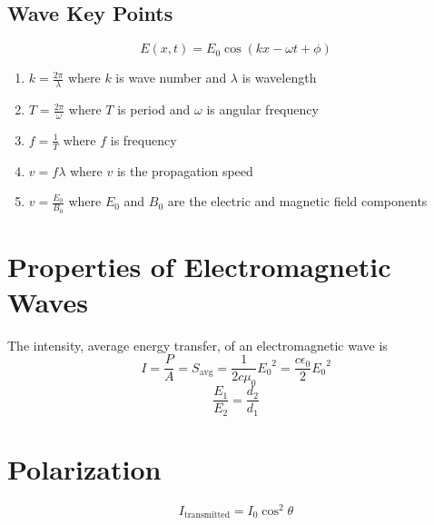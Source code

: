 \documentclass{article}
\begin{document}
\subsection*{Wave Key Points}
\[E(x, t) = E_0 \cos\left(kx - \omega t + \phi\right)\]
\begin{enumerate}
    \item $k=\frac{2\pi}{\lambda}$ where $k$ is wave number and $\lambda$ is wavelength
    \item $T=\frac{2\pi}{\omega}$ where $T$ is period and $\omega$ is angular frequency
    \item $f=\frac{1}{T}$ where $f$ is frequency
    \item $v=f\lambda$ where $v$ is the propagation speed
    \item $v=\frac{E_0}{B_0}$ where $E_0$ and $B_0$ are the electric and magnetic field components
\end{enumerate}

\section*{Properties of Electromagnetic Waves}
The intensity, average energy transfer, of an electromagnetic wave is
\[I=\frac{P}{A}=S_\text{avg}=\frac{1}{2c\mu_0}{E_0}^2 = \frac{c\epsilon_0}{2}{E_0}^2\]
\[\frac{E_1}{E_2}=\frac{d_2}{d_1}\]

\section*{Polarization}
\[I_\text{transmitted}=I_0 \cos^2 \theta\]
\end{document}
